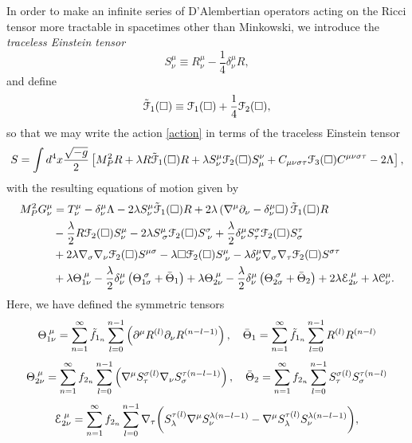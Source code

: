 In order to make an infinite series of D'Alembertian operators acting on the Ricci tensor more tractable in spacetimes other than Minkowski, we introduce the \emph{traceless Einstein tensor} \cite{Biswas:2016etb}
\[
S_{\nu}^{\mu}\equiv R_{\nu}^{\mu}-\frac{1}{4}\delta_{\nu}^{\mu}R,
 \]
and define
\[
\label{Ftilde}
\tilde{{\cal F}}_{1}(\Box)\equiv{\cal F}_{1}(\Box)+\frac{1}{4}{\cal F}_{2}(\Box),
 \]
so that we may write the action \eqref{action} in terms of the traceless Einstein tensor
\[
S=\int d^{4}x\frac{\sqrt{-g}}{2}\left[M_{P}^{2}R+\lambda R\tilde{{\cal F}}_{1}(\Box)R+\lambda S_{\nu}^{\mu}{\cal F}_{2}(\Box)S_{\mu}^{\nu}+C_{\mu\nu\sigma\tau}{\cal F}_{3}(\Box)C^{\mu\nu\sigma\tau}-2\Lambda\right]
, \]
with the resulting equations of motion given by
\[
\label{eomS}
\begin{aligned}M_{P}^{2}G_{\nu}^{\mu} & =T_{\nu}^{\mu}-\delta_{\nu}^{\mu}\Lambda-2\lambda S_{\nu}^{\mu}{\cal \tilde{F}}_{1}(\Box)R+2\lambda\left(\nabla^{\mu}\partial_{\nu}-\delta_{\nu}^{\mu}\square\right)\tilde{{\cal F}}_{1}(\Box)R\\
 & -\frac{\lambda}{2}R{\cal F}_{2}(\Box)S_{\nu}^{\mu}-2\lambda S_{\;\sigma}^{\mu}{\cal F}_{2}(\Box)S_{\;\nu}^{\sigma}+\frac{\lambda}{2}\delta_{\nu}^{\mu}S_{\tau}^{\sigma}{\cal F}_{2}(\Box)S_{\sigma}^{\tau}\\
 & +2\lambda\nabla_{\sigma}\nabla_{\nu}{\cal F}_{2}(\Box)S^{\mu\sigma}-\lambda\square{\cal F}_{2}(\Box)S_{\;\nu}^{\mu}-\lambda\delta_{\nu}^{\mu}\nabla_{\sigma}\nabla_{\tau}{\cal F}_{2}(\Box)S^{\sigma\tau}\\
 & +\lambda\Theta_{1\nu}^{\;\mu}-\frac{\lambda}{2}\delta_{\nu}^{\mu}\left(\Theta_{1\sigma}^{\;\sigma}+\bar{\Theta}_{1}\right)+\lambda\Theta_{2\nu}^{\;\mu}-\frac{\lambda}{2}\delta_{\nu}^{\mu}\left(\Theta_{2\sigma}^{\;\sigma}+\bar{\Theta}_{2}\right)+2\lambda{\cal E}_{2\nu}^{\;\mu}+\lambda{\cal C}_{\nu}^{\mu}.
\end{aligned}
 \]
Here, we have defined the symmetric tensors
\[
\nonumber
\Theta_{1\nu}^{\;\mu}=\sum_{n=1}^{\infty}\tilde{f}_{1_{n}}\sum_{l=0}^{n-1}\left(\partial^{\mu}R^{(l)}\partial_{\nu}R^{(n-l-1)}\right),\quad\bar{\Theta}_{1}=\sum_{n=1}^{\infty}\tilde{f}_{1_{n}}\sum_{l=0}^{n-1}R^{(l)}R^{(n-l)}
\]
\[
 \Theta_{2\nu}^{\;\mu}=\sum_{n=1}^{\infty}f_{2_{n}}\sum_{l=0}^{n-1}\left(\nabla^{\mu}S_{\tau}^{\sigma(l)}\nabla_{\nu}S_{\sigma}^{\tau(n-l-1)}\right),\quad\bar{\Theta}_{2}=\sum_{n=1}^{\infty}f_{2_{n}}\sum_{l=0}^{n-1}S_{\tau}^{\sigma(l)}S_{\sigma}^{\tau(n-l)}
 \nonumber
 \]
\[
\label{symtens}
{\cal E}_{2\nu}^{\;\mu}=\sum_{n=1}^{\infty}f_{2_{n}}\sum_{l=0}^{n-1}\nabla_{\tau}\biggl(S_{\lambda}^{\tau(l)}\nabla^{\mu}S_{\nu}^{\lambda(n-l-1)}-\nabla^{\mu}S_{\lambda}^{\tau(l)}S_{\nu}^{\lambda(n-l-1)}\biggr)
 ,\]

